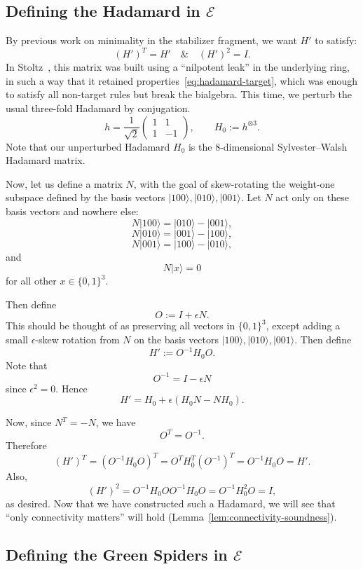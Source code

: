 \documentclass[copyright,creativecommons]{eptcs}
\theoremstyle{definition}
\theoremstyle{remark}
\begin{document}
\subsection{Defining the Hadamard in \texorpdfstring{\(\mathcal E\)}{E}}
\label{sec:defining-hadamard-e}

By previous work on minimality in the stabilizer fragment, we want \(H'\) to satisfy:
\begin{equation}
\label{eq:hadamard-target}
(H')^T=H' \quad \& \quad (H')^2=I.
\end{equation}
In Stoltz~\cite{stoltz2026simplified}, this matrix was built using a ``nilpotent leak'' in the underlying ring, in such a way that it retained properties~\eqref{eq:hadamard-target}, which was enough to satisfy all non-target rules but break the bialgebra.
This time, we perturb the usual three-fold Hadamard by conjugation.
\[
h=\frac{1}{\sqrt 2}
\begin{pmatrix}
1&1\\
1&-1
\end{pmatrix},
\qquad
H_0:=h^{\otimes 3}.
\]
Note that our unperturbed Hadamard \(H_0\) is the \(8\)-dimensional Sylvester--Walsh Hadamard matrix.

Now, let us define a matrix \(N\), with the goal of skew-rotating the weight-one subspace defined by the basis vectors \(\lvert 100\rangle,\lvert 010\rangle,\lvert 001\rangle\). Let \(N\) act only on these basis vectors and nowhere else:
\[
N\lvert 100\rangle=\lvert 010\rangle-\lvert 001\rangle,
\]
\[
N\lvert 010\rangle=\lvert 001\rangle-\lvert 100\rangle,
\]
\[
N\lvert 001\rangle=\lvert 100\rangle-\lvert 010\rangle,
\]
and
\[
N\lvert x\rangle=0
\]
for all other \(x\in\{0,1\}^3\).

Then define
\[
O:=I+\epsilon N.
\]
This should be thought of as preserving all vectors in \(\{0,1\}^3\), except adding a small \(\epsilon\)-skew rotation from \(N\) on the basis vectors \(\lvert 100\rangle,\lvert 010\rangle,\lvert 001\rangle\).
Then define
\[
H':=O^{-1}H_0O.
\]
Note that
\[
O^{-1}=I-\epsilon N
\]
since \(\epsilon^2=0\). Hence
\[
H'=H_0+\epsilon(H_0N-NH_0).
\]

Now, since \(N^T=-N\), we have
\[
O^T=O^{-1}.
\]
Therefore
\[
(H')^T
=
(O^{-1}H_0O)^T
=
O^TH_0^T(O^{-1})^T
=
O^{-1}H_0O
=
H'.
\]
Also,
\[
(H')^2
=
O^{-1}H_0OO^{-1}H_0O
=
O^{-1}H_0^2O
=
I,
\]
as desired.
Now that we have constructed such a Hadamard, we will see that ``only connectivity matters'' will hold (Lemma~\ref{lem:connectivity-soundness}).

\subsection{Defining the Green Spiders in \texorpdfstring{\(\mathcal E\)}{E}}
\label{sec:defining-green-spiders-e}
\end{document}
